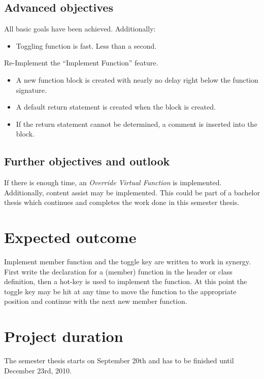 \subsection{Advanced objectives}
All basic goals have been achieved. Additionally:
\begin{itemize}
 \item Toggling function is fast. Less than a second.
\end{itemize}

Re-Implement the ``Implement Function'' feature.
\begin{itemize}
 \item A new function block is created with nearly no delay right below the
function signature.
 \item A default return statement is created when the block is created.
 \item If the return statement cannot be determined, a comment is inserted into
the block.
\end{itemize}

\subsection{Further objectives and outlook}

If there is enough time, an \textit{Override Virtual Function} is implemented.
Additionally, content assist may be implemented. This could be part of a
bachelor thesis which continues and completes the work done in this semester
thesis.

\section{Expected outcome}

Implement member function and the toggle key are written to work in synergy.
First write the declaration for a (member) function in the header or class
definition, then a hot-key is used to implement the function. At this point the
toggle key may be hit at any time to move the function to the appropriate
position and continue with the next new member function.

\section{Project duration}
The semester thesis starts on September 20th and has to be finished until
December 23rd, 2010.

